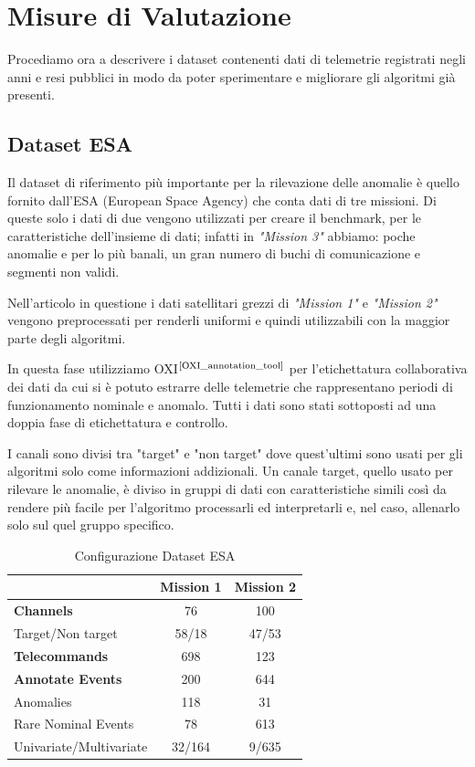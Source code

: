 \chapter{Misure di Valutazione}
Procediamo ora a descrivere i dataset contenenti dati di telemetrie registrati negli anni e resi pubblici in modo da poter sperimentare e migliorare gli algoritmi già presenti.

\section{Dataset ESA}

Il dataset di riferimento più importante per la rilevazione delle anomalie è quello fornito dall'ESA (European Space Agency) che conta dati di tre missioni. Di queste solo i dati di due vengono utilizzati per creare il benchmark, per le caratteristiche dell'insieme di dati; infatti in \textit{"Mission 3"} abbiamo: poche anomalie e per lo più banali, un gran numero di buchi di comunicazione e segmenti non validi.

Nell'articolo in questione i dati satellitari grezzi di \textit{"Mission 1"} e \textit{"Mission 2"} vengono preprocessati per renderli uniformi e quindi utilizzabili con la maggior parte degli algoritmi.

In questa fase utilizziamo OXI$^{\text{\cite{OXI_annotation_tool}}}$ per l'etichettatura collaborativa dei dati da cui si è potuto estrarre delle telemetrie che rappresentano periodi di funzionamento nominale e anomalo. Tutti i dati sono stati sottoposti ad una doppia fase di etichettatura e controllo.

I canali sono divisi tra "target" e "non target" dove quest'ultimi sono usati per gli algoritmi solo come informazioni addizionali. Un canale target, quello usato per rilevare le anomalie, è diviso in gruppi di dati con caratteristiche simili così da rendere più facile per l'algoritmo processarli ed interpretarli e, nel caso, allenarlo solo sul quel gruppo specifico.
\pagebreak

\begin{table}[h]
    \centering
    \begin{tabular}{|l|c|c|}
        \hline
         \textbf{}& \textbf{Mission 1} & \textbf{Mission 2}\\
         \hline
        \textbf{Channels} & 76 & 100\\
        Target/Non target & 58/18 & 47/53\\
        \hline
        \textbf{Telecommands} & 698 & 123\\
        \hline
        \textbf{Annotate Events} & 200 & 644 \\
        Anomalies& 118 & 31\\
        Rare Nominal Events &78  & 613\\
        Univariate/Multivariate& 32/164 & 9/635\\
        \hline
    \end{tabular}
    \caption{Configurazione Dataset ESA}
    \label{tab:costituzioneESA_dataset}
\end{table}


